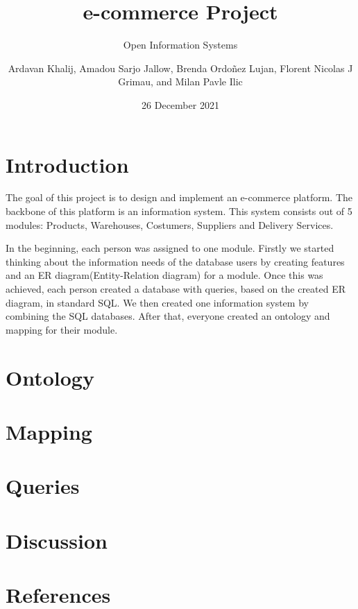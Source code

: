 \documentclass{article}
\title{e-commerce Project}
\subtitle{Open Information Systems}
\author{Ardavan Khalij, Amadou Sarjo Jallow, Brenda Ordoñez Lujan, Florent Nicolas J Grimau, and Milan Pavle Ilic}
\date{26 December 2021}
\begin{document}
\maketitle
\tableofcontents
\newpage
\section{Introduction}
The goal of this project is to design and implement an e-commerce platform. The backbone of this platform is an information system. This system consists out of 5 modules: Products, Warehouses, Costumers, Suppliers and Delivery Services.

In the beginning, each person was assigned to one module. Firstly we started thinking about the information needs of the database users by creating features and an ER diagram(Entity-Relation diagram) for a module. Once this was achieved, each person created a database with queries, based on the created ER diagram, in standard SQL. We then created one information system by combining the SQL databases. After that, everyone created an ontology and mapping for their module.

\section{Ontology}


\section{Mapping}


\section{Queries}


\section{Discussion}


\section{References}
\end{document}
